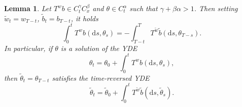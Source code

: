 \documentclass[10pt]{article}
\newcommand{\mathd}{\mathrm{d}}
\newtheorem{lemma}{Lemma}
\begin{document}
\begin{lemma}
  \label{sec4.3 lemma reversed YDE}Let $T^w b \in C^{\gamma}_t C^{\beta}_x$
  and $\theta \in C^{\alpha}_t$ such that $\gamma + \beta \alpha > 1$. Then
  setting $\tilde{w}_t = w_{T - t}$, $\tilde{b}_t = b_{T - t}$, it holds
  \begin{equation}
    \int_0^t T^w b (\mathd s, \theta_s) = - \int_{T - t}^T T^{\tilde{w}}
    \tilde{b} (\mathd s, \theta_{T - s}) . \label{sec4.3 eq lemma reversed}
  \end{equation}
  In particular, if $\theta$ is a solution of the YDE
  \[ \theta_t = \theta_0 + \int_0^t T^w b (\mathd s, \theta_s), \]
  then $\tilde{\theta}_t = \theta_{T - t}$ satisfies the time-reversed YDE
  \[ \tilde{\theta}_t = \tilde{\theta}_0 + \int_0^t T^{\tilde{w}} \tilde{b}
     (\mathd s, \tilde{\theta}_s) . \]
\end{lemma}
\end{document}
